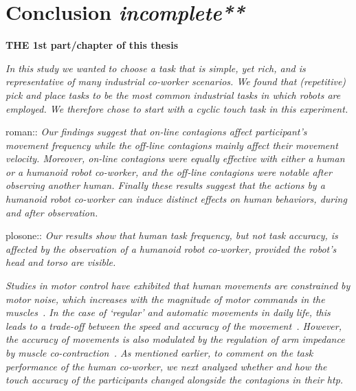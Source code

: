 
{\color{blue}\chapter*{Conclusion \textit{incomplete**}}}

\textbf{THE 1st part/chapter of this thesis}


\textit{In this study we wanted to choose a task that is simple, yet rich, and is representative of many industrial co-worker scenarios. We found that (repetitive) pick and place tasks to be the most common industrial tasks in which robots are employed. We therefore chose to start with a cyclic touch task in this experiment.}

roman::\textit{ Our findings suggest that on-line contagions affect participant's movement frequency while the \textit{off-line} contagions mainly affect their movement velocity. Moreover, on-line contagions were equally effective with either a human or a humanoid robot co-worker, and the \textit{off-line} contagions were notable after observing another human. Finally these results suggest that the actions by a humanoid robot co-worker can induce distinct effects on human behaviors, during and after observation.}


plosone:: \textit{Our results show that human task frequency, but not task accuracy, is affected by the observation of a humanoid robot co-worker, provided the robot's head and torso are visible.
}




\textit{Studies in motor control have exhibited that human movements are constrained by motor noise, which increases with the magnitude of motor commands in the muscles~\cite{Harris:Nature:1998}. In the case of `regular' and automatic movements in daily life, this leads to a trade-off between the speed and accuracy of the movement~\cite{Fitts:JEP:1954}. However, the accuracy of movements is also modulated by the regulation of arm impedance by muscle co-contraction~\cite{Burdet:nature:2001, Franklin:JoN:2008, Ganesh:RAS:2013}. As mentioned earlier, to comment on the task performance of the human co-worker, we next analyzed whether and how the touch accuracy of the participants changed alongside the contagions in their {\it htp}. 
}

